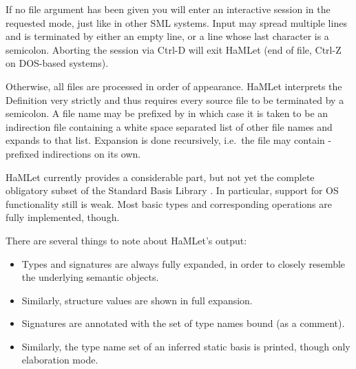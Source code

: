 \documentclass[twoside,titlepage]{article}
\begin{document}
If no file argument has been given you will enter an interactive session in the requested mode, just like in other SML systems. Input may spread multiple lines and is terminated by either an empty line, or a line whose last character is a semicolon. Aborting the session via Ctrl-D will exit HaMLet (end of file, Ctrl-Z on DOS-based systems).

Otherwise, all files are processed in order of appearance. HaMLet interprets the Definition very strictly and thus requires every source file to be terminated by a semicolon. A file name may be prefixed by {\tt@} in which case it is taken to be an indirection file containing a white space separated list of other file names and expands to that list. Expansion is done recursively, i.e.\ the file may contain {\tt@}-prefixed indirections on its own.

HaMLet currently provides a considerable part, but not yet the complete obligatory subset of the Standard Basis Library \cite{basis}. In particular, support for OS functionality still is weak. Most basic types and corresponding operations are fully implemented, though.

There are several things to note about HaMLet's output:

\begin{itemize}
\item Types and signatures are always fully expanded, in order to closely resemble the underlying semantic objects.
\item Similarly, structure values are shown in full expansion.
\item Signatures are annotated with the set of type names bound (as a comment).
\item Similarly, the type name set of an inferred static basis is printed, though only elaboration mode.
\end{itemize}

%
%
\end{document}
